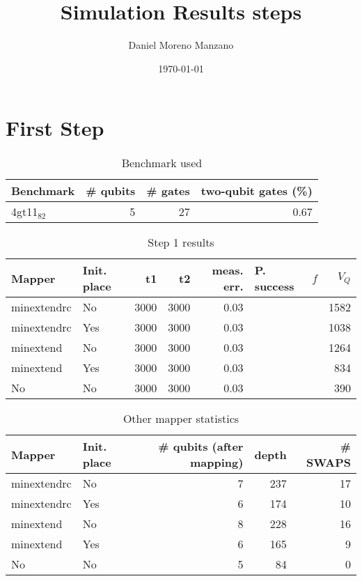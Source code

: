 \documentclass[11pt]{article}
\author{Daniel Moreno Manzano}
\date{\today}
\title{Simulation Results steps}
\begin{document}
\maketitle


\section{First Step}
\label{sec:org73a5c25}

\begin{table}[htbp]
\caption{\label{tab:orge9d1d9c}
Benchmark used}
\centering
\begin{tabular}{lrrr}
\hline
Benchmark & \# qubits & \# gates & two-qubit gates (\%)\\
\hline
4gt11\(_{\text{82}}\) & 5 & 27 & 0.67\\
\hline
\end{tabular}
\end{table}

\begin{table}[htbp]
\caption{\label{tab:org9bedc84}
Step 1 results}
\centering
\begin{tabular}{llrrrllr}
\hline
Mapper & Init. place & t1 & t2 & meas. err. & P. success & \(f\) & \(V_Q\)\\
\hline
minextendrc & No & 3000 & 3000 & 0.03 &  &  & 1582\\
minextendrc & Yes & 3000 & 3000 & 0.03 &  &  & 1038\\
\hline
minextend & No & 3000 & 3000 & 0.03 &  &  & 1264\\
minextend & Yes & 3000 & 3000 & 0.03 &  &  & 834\\
No & No & 3000 & 3000 & 0.03 &  &  & 390\\
\hline
\end{tabular}
\end{table}

\begin{table}[htbp]
\caption{\label{tab:orge375251}
Other mapper statistics}
\centering
\begin{tabular}{llrrr}
\hline
Mapper & Init. place & \# qubits (after mapping) & depth & \# SWAPS\\
\hline
minextendrc & No & 7 & 237 & 17\\
minextendrc & Yes & 6 & 174 & 10\\
\hline
minextend & No & 8 & 228 & 16\\
minextend & Yes & 6 & 165 & 9\\
No & No & 5 & 84 & 0\\
\hline
\end{tabular}
\end{table}
\end{document}
